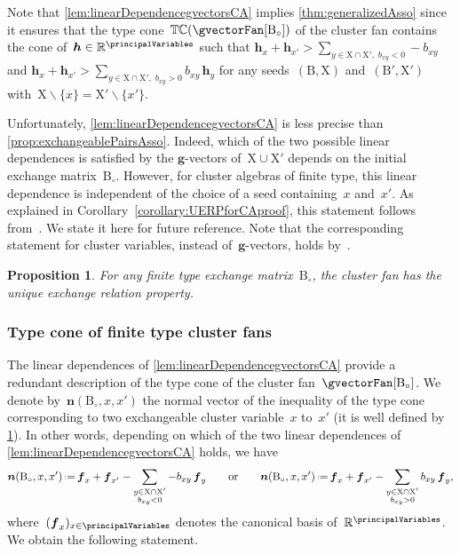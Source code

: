 \documentclass{amsart}
\newtheorem{proposition}[theorem]{Proposition}
\theoremstyle{definition}
\newcommand{\R}{\mathbb{R}} %
\renewcommand{\b}[1]{{\boldsymbol{#1}}} %
\newcommand{\ssm}{\smallsetminus} %
\newcommand{\eqdef}{\mbox{\,\raisebox{0.2ex}{\scriptsize\ensuremath{\mathrm:}}\ensuremath{=}\,}} %
\newcommand{\vincent}[1]{\todo[color=blue!30]{#1 \\ \hfill --- V.}}
\newcommand{\typeCone}{\mathbb{TC}} %
\newcommand{\cluster}{\mathrm{X}} %
\newcommand{\B}{\mathrm{B}} %
\begin{document}
Note that \cref{lem:linearDependencegvectorsCA} implies \cref{thm:generalizedAsso} since it ensures that the type cone~$\typeCone(\gvectorFan[\B_\circ])$ of the cluster fan contains the cone of~${\b{h} \in \R^{\principalVariables}}$ such that
\(
\b{h}_x + \b{h}_{x'} > \sum_{{y \in \cluster \cap \cluster', \; b_{xy} < 0}} -b_{xy}
\)
and
\(
\b{h}_x + \b{h}_{x'} > \sum_{{y \in \cluster \cap \cluster', \; b_{xy} > 0}} b_{xy} \, \b{h}_y
\)
for any seeds~$(\B, \cluster)$ and~$(\B', \cluster')$ with~${\cluster \ssm \{x\} = \cluster' \ssm \{x'\}}$.

Unfortunately, \cref{lem:linearDependencegvectorsCA} is less precise than \cref{prop:exchangeablePairsAsso}. Indeed, which of the two possible linear dependences is satisfied by the $\b{g}$-vectors of~$\cluster \cup \cluster'$ depends on the initial exchange matrix~$\B_\circ$.
However, for cluster algebras of finite type, this linear dependence is independent of the choice of a seed containing~$x$ and~$x'$.
As explained in Corollary~\ref{corollary:UERPforCAproof}, this statement follows from~\cite[Theorem 7.5]{BuanMarshReinekeReitenTodorov}.
We state it here for future reference.
Note that the corresponding statement for cluster variables, instead of~$\b{g}$-vectors, holds by~\cite[Theorem 1.11]{FominZelevinsky-ClusterAlgebrasII}.

\begin{proposition}
\label{prop:uniqueExchangePropertyCA}
For any finite type exchange matrix~$\B_\circ$, the cluster fan has the unique exchange relation property.
\end{proposition}


\subsubsection{Type cone of finite type cluster fans}

The linear dependences of \cref{lem:linearDependencegvectorsCA} provide a redundant description of the type cone of the cluster fan~$\gvectorFan[\B_\circ]$.
We denote by~$\b{n}(\B_\circ, x, x')$ the normal vector of the inequality of the type cone corresponding to two exchangeable cluster variable~$x$ to~$x'$ (it is well defined by \cref{prop:uniqueExchangePropertyCA}).
In other words, depending on which of the two linear dependences of \cref{lem:linearDependencegvectorsCA} holds, we have
\[
\b{n}(\B_\circ, x, x') \eqdef \b{f}_x + \b{f}_{x'} - \sum_{\substack{y \in \cluster \cap \cluster' \\ b_{xy} < 0}} -b_{xy} \, \b{f}_y
\qquad\text{or}\qquad
\b{n}(\B_\circ, x, x') \eqdef \b{f}_x + \b{f}_{x'} - \sum_{\substack{y \in \cluster \cap \cluster' \\ b_{xy} > 0}} b_{xy} \, \b{f}_y,
\]
where~$(\b{f}_x)_{x \in \principalVariables}$ denotes the canonical basis of~$\R^{\principalVariables}$.
We obtain the following statement.
\end{document}
